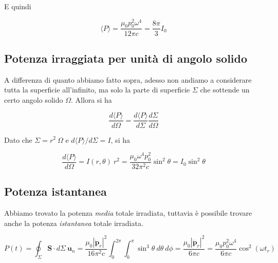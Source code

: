 E quindi 

\begin{tcolorbox}[colback=yellow!10!white, colframe=orange!70!black, boxrule=0.8pt]
\begin{equation} \label{eq: potenza_dipolo_elettrico}
    \langle P \rangle = \frac{\mu_0 p_0^2 \omega^4}{12 \pi c} = \frac{8 \pi}{3} I_0
\end{equation}
\end{tcolorbox}

\subsection{Potenza irraggiata per unità di angolo solido}

A differenza di quanto abbiamo fatto sopra, adesso non andiamo a considerare tutta la superficie all'infinito, ma solo la parte di superficie $\Sigma$ che sottende un certo angolo solido $\Omega$. Allora si ha 

\begin{equation}
    \frac{d \langle P \rangle}{d \Omega} = \frac{d\langle P \rangle}{d\Sigma} \frac{d\Sigma}{d\Omega}
\end{equation}

Dato che $\Sigma = r^2 \ \Omega$ e $d\langle P \rangle/d\Sigma = I$, si ha

\begin{tcolorbox}[colback=yellow!10!white, colframe=orange!70!black, boxrule=0.8pt]
\begin{equation}
    \frac{d \langle P \rangle}{d \Omega} = I(r, \theta) \ r^2 = \frac{\mu_0 \omega^4 p_0^2}{32 \pi^2 c} \sin^2 \theta  = I_0 \sin^2 \theta
\end{equation}
\end{tcolorbox}

\subsection{Potenza istantanea}

Abbiamo trovato la potenza \emph{media} totale irradiata, tuttavia è possibile trovare anche la potenza \emph{istantanea} totale irradiata.

\begin{equation}
    P(t) = \oint_{\Sigma} \mathbf{S} \cdot d\Sigma \ \mathbf{u}_n = \frac{\mu_0 |\ddot{\mathbf{p}}_r|^2}{16 \pi^2 c} \int_0^{2\pi} \int_{0}^{\pi} \sin^3 \theta \ d\theta \ d\phi = \frac{\mu_0 |\ddot{\mathbf{p}}_r|^2}{6 \pi c} = \frac{\mu_0 p_0^2 \omega^4}{6 \pi c} \cos^2 (\omega t_r)
\end{equation}

